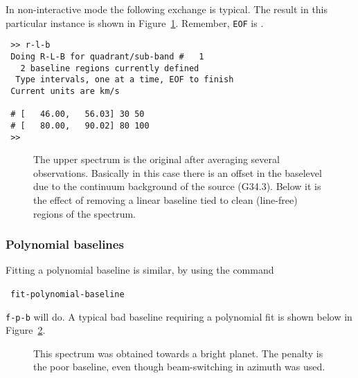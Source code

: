 In non-interactive mode the following exchange is typical. The result
in this particular instance is shown in
Figure~\ref{fig:specx_rlb}. Remember, {\tt EOF} is \ctrld .
\begin{verbatim}
 >> r-l-b 
 Doing R-L-B for quadrant/sub-band #   1
   2 baseline regions currently defined
  Type intervals, one at a time, EOF to finish
 Current units are km/s  
 
 # [   46.00,   56.03] 30 50
 # [   80.00,   90.02] 80 100
 >> 
\end{verbatim}
%
\begin{figure}[htb]
\centering
\leavevmode
\epsfysize=3.5in
\vspace*{-0.5cm}
\begin{center}
\begin{minipage}[t]{5in}
\caption[Removing a linear baseline]
{\small{The upper spectrum is the original after averaging several
observations. Basically in this case there is an offset in the
baselevel due to the continuum background of the source (G34.3). Below
it is the effect of removing a linear baseline tied to clean
(line-free) regions of the spectrum.}  }
\label{fig:specx_rlb}
\end{minipage}
\end{center}
\end{figure}
 
\subsubsection{Polynomial baselines}
\label{sec:poly-baselines}
Fitting a polynomial baseline is similar, by using the command

\SP\ \verb|fit-polynomial-baseline|

{\tt f-p-b} will do. A typical bad baseline requiring a polynomial fit
is shown below in Figure~\ref{fig:specx_badbaseline}.

\begin{figure}[htb]
\centering
\leavevmode
\epsfysize=3.2in
\vspace*{-0.5cm}
\begin{center}
\begin{minipage}[t]{5in}
\caption[Typical bad baseline]
{\small{This spectrum was obtained towards a bright planet. The
penalty is the poor baseline, even though beam-switching in azimuth
was used.  }}
\label{fig:specx_badbaseline}
\end{minipage}
\end{center}
\end{figure}

